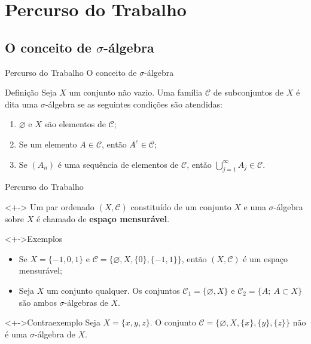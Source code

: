 
	\AtBeginSection[]{
	\begin{frame}
		\frametitle{}
		\tableofcontents[currentsection]
	\end{frame}
}


	\section{Percurso do Trabalho}
	\subsection{O conceito de $\sigma$-álgebra}
	\begin{frame}{Percurso do Trabalho} %
	{O conceito de $\sigma$-álgebra}

		\begin{block}{Definição}
			\justify Seja $X$ um conjunto não vazio. Uma família $\mathcal{C}$ de subconjuntos de $X$ é dita uma $\sigma$-álgebra se as seguintes condições são atendidas:
			\begin{enumerate}[<+->]
				\item $\varnothing$ e $X$ são elementos de $\mathcal{C}$;     
				\item Se um elemento $A \in \mathcal{C}$, então $A^c \in \mathcal{C}$;
				\item Se $(A_n)$ é uma sequência de elementos de $\mathcal{C}$, 
				então $\displaystyle \bigcup_{j = 1}^\infty A_j \in \mathcal{C}$.
			\end{enumerate}
		\end{block}
	\end{frame} %
	
	\begin{frame}{Percurso do Trabalho}
		\begin{block}<+->{}
			\justify Um par ordenado $(X, \mathcal{C})$  constituído de um conjunto $X$ e uma $\sigma$-álgebra sobre $X$ é chamado  de  \textbf{espaço mensurável}.
		\end{block}
		\begin{block}<+->{Exemplos}
			\justify
			\begin{itemize}[<+->]
				\item Se $X = \{-1,0,1\}$ e $\mathcal{C} = \{\varnothing, X, \{0\}, \{-1,1\}\}$, então $(X, \mathcal{C})$ é um espaço mensurável;
				\item Seja $X$ um conjunto qualquer. 
				Os conjuntos $\mathcal{C}_1 = \{\varnothing, X\}$  e $\mathcal{C}_2 = \{ A; \ A \subset X\}$ são ambos $\sigma$-álgebras de $X$.
			\end{itemize}
		\end{block}
		\begin{block}<+->{Contraexemplo}
			 \justify Seja $X = \{x,y,z\}$. O conjunto $\mathcal{C} = \{\varnothing, X, \{x\}, \{y\}, \{z\}\}$ não é uma $\sigma$-álgebra de $X$.
		\end{block}
	\end{frame}
 	
